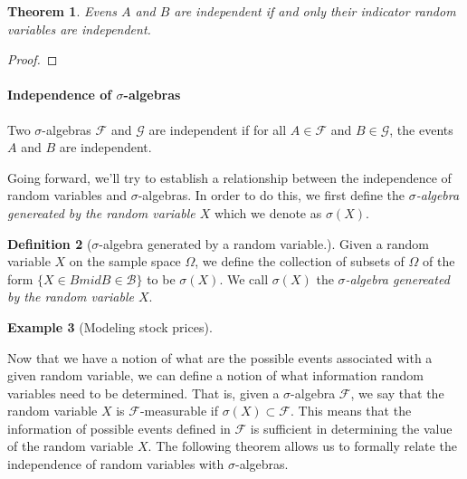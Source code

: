 \documentclass[12pt]{article}
\newcommand{\calF}{\mathcal{F}}
\newtheorem{thm}{Theorem}[section]
\theoremstyle{definition}
\newtheorem{defn}[thm]{Definition}
\newtheorem{exmp}[thm]{Example}
\theoremstyle{remark}
\numberwithin{equation}{section}
\begin{document}

 \begin{thm}
Evens $A$ and $B$ are independent if and only their indicator random variables are independent.
 \end{thm}
\begin{proof}
\end{proof}
 \paragraph{Independence of $\sigma$-algebras}%
 \label{par:independence_of_sigma_algebras}
 
 Two $\sigma$-algebras $\mathcal{F}$ and $\mathcal{G}$ are independent if for all $A\in\mathcal{F}$ and $B\in\mathcal{G}$, the events $A$ and $B$ are independent. 


Going forward, we'll try to establish a relationship between the independence of random variables and $\sigma$-algebras. In order to do this, we first define the \emph{$\sigma$-algebra genereated by the random variable $X$} which we denote as $\sigma(X)$. 

\begin{defn}[$\sigma$-algebra generated by a random variable.]
  Given a random variable $X$ on the sample space $\Omega$, we define the collection of subsets of $\Omega$ of the form $\{X \in B mid B \in \mathcal{B}\}$ to be $\sigma(X)$. We call $\sigma(X)$ the \emph{$\sigma$-algebra genereated by the random variable $X$}.
\end{defn}

\begin{exmp}[Modeling stock prices]
\end{exmp}


Now that we have a notion of what are the possible events associated with a given random variable, we can define a notion of what information random variables need to be determined. That is, given a $\sigma$-algebra $\calF$, we say that the random variable $X$ is $\calF$-measurable if $\sigma(X)\subset \calF$. This means that the information of possible events defined in $\calF$ is sufficient in determining the value of the random variable $X$. The following theorem allows us to formally relate the independence of random variables with $\sigma$-algebras.
\end{document}

